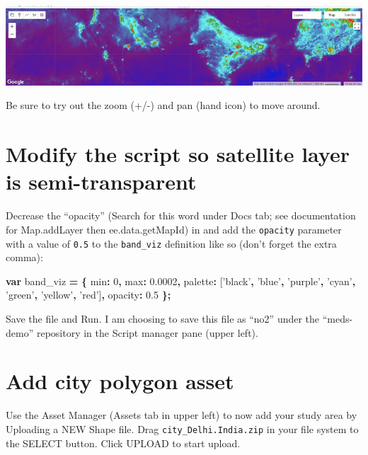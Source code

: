 \documentclass[]{book}
\newenvironment{Shaded}{\begin{snugshade}}{\end{snugshade}}
\newcommand{\DataTypeTok}[1]{\textcolor[rgb]{0.13,0.29,0.53}{#1}}
\newcommand{\DecValTok}[1]{\textcolor[rgb]{0.00,0.00,0.81}{#1}}
\newcommand{\FloatTok}[1]{\textcolor[rgb]{0.00,0.00,0.81}{#1}}
\newcommand{\KeywordTok}[1]{\textcolor[rgb]{0.13,0.29,0.53}{\textbf{#1}}}
\newcommand{\NormalTok}[1]{#1}
\newcommand{\OperatorTok}[1]{\textcolor[rgb]{0.81,0.36,0.00}{\textbf{#1}}}
\newcommand{\StringTok}[1]{\textcolor[rgb]{0.31,0.60,0.02}{#1}}
\begin{document}
\includegraphics{images/gee_run-init-dataset.png}

Be sure to try out the zoom (+/-) and pan (hand icon) to move around.

\hypertarget{modify-the-script-so-satellite-layer-is-semi-transparent}{%
\section{Modify the script so satellite layer is semi-transparent}\label{modify-the-script-so-satellite-layer-is-semi-transparent}}

Decrease the ``opacity'' (Search for this word under Docs tab; see documentation for Map.addLayer then ee.data.getMapId) in and add the \texttt{opacity} parameter with a value of \texttt{0.5} to the \texttt{band\_viz} definition like so (don't forget the extra comma):

\begin{Shaded}
\begin{Highlighting}[]
\KeywordTok{var}\NormalTok{ band_viz }\OperatorTok{=} \OperatorTok{\{}
  \DataTypeTok{min}\OperatorTok{:} \DecValTok{0}\OperatorTok{,}
  \DataTypeTok{max}\OperatorTok{:} \FloatTok{0.0002}\OperatorTok{,}
  \DataTypeTok{palette}\OperatorTok{:}\NormalTok{ [}\StringTok{'black'}\OperatorTok{,} \StringTok{'blue'}\OperatorTok{,} \StringTok{'purple'}\OperatorTok{,} \StringTok{'cyan'}\OperatorTok{,} \StringTok{'green'}\OperatorTok{,} \StringTok{'yellow'}\OperatorTok{,} \StringTok{'red'}\NormalTok{]}\OperatorTok{,}
  \DataTypeTok{opacity}\OperatorTok{:} \FloatTok{0.5}
\OperatorTok{\};}
\end{Highlighting}
\end{Shaded}

Save the file and Run. I am choosing to save this file as ``no2'' under the ``meds-demo'' repository in the Script manager pane (upper left).

\hypertarget{add-city-polygon-asset}{%
\section{Add city polygon asset}\label{add-city-polygon-asset}}

Use the Asset Manager (Assets tab in upper left) to now add your study area by Uploading a {NEW} Shape file. Drag \texttt{city\_Delhi.India.zip} in your file system to the {SELECT} button. Click {UPLOAD} to start upload.
\end{document}
